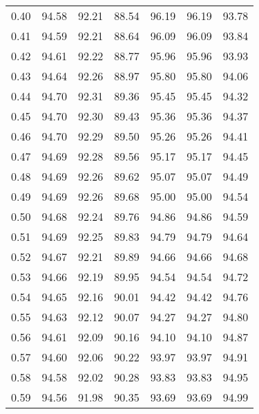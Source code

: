 \begin{tabular}{|c|c|c|c|c|c|c|}
      0.40 &     94.58 &     92.21 &      88.54 &   96.19 &      96.19 &         93.78 \\
      0.41 &     94.59 &     92.21 &      88.64 &   96.09 &      96.09 &         93.84 \\
      0.42 &     94.61 &     92.22 &      88.77 &   95.96 &      95.96 &         93.93 \\
      0.43 &     94.64 &     92.26 &      88.97 &   95.80 &      95.80 &         94.06 \\
      0.44 &     94.70 &     92.31 &      89.36 &   95.45 &      95.45 &         94.32 \\
      0.45 &     94.70 &     92.30 &      89.43 &   95.36 &      95.36 &         94.37 \\
      0.46 &     94.70 &     92.29 &      89.50 &   95.26 &      95.26 &         94.41 \\
      0.47 &     94.69 &     92.28 &      89.56 &   95.17 &      95.17 &         94.45 \\
      0.48 &     94.69 &     92.26 &      89.62 &   95.07 &      95.07 &         94.49 \\
      0.49 &     94.69 &     92.26 &      89.68 &   95.00 &      95.00 &         94.54 \\
      0.50 &     94.68 &     92.24 &      89.76 &   94.86 &      94.86 &         94.59 \\
      0.51 &     94.69 &     92.25 &      89.83 &   94.79 &      94.79 &         94.64 \\
      0.52 &     94.67 &     92.21 &      89.89 &   94.66 &      94.66 &         94.68 \\
      0.53 &     94.66 &     92.19 &      89.95 &   94.54 &      94.54 &         94.72 \\
      0.54 &     94.65 &     92.16 &      90.01 &   94.42 &      94.42 &         94.76 \\
      0.55 &     94.63 &     92.12 &      90.07 &   94.27 &      94.27 &         94.80 \\
      0.56 &     94.61 &     92.09 &      90.16 &   94.10 &      94.10 &         94.87 \\
      0.57 &     94.60 &     92.06 &      90.22 &   93.97 &      93.97 &         94.91 \\
      0.58 &     94.58 &     92.02 &      90.28 &   93.83 &      93.83 &         94.95 \\
      0.59 &     94.56 &     91.98 &      90.35 &   93.69 &      93.69 &         94.99 \\

\end{tabular}
